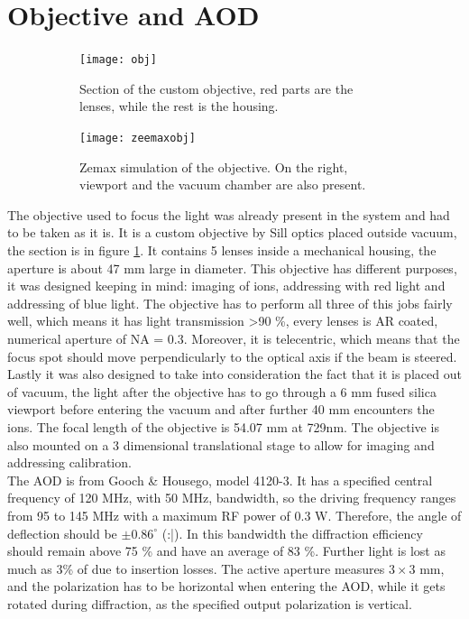 \section{Objective and AOD}
\label{sec:obj}
\begin{figure}[H]
     \centering
     \begin{subfigure}[b]{0.4\textwidth}
         \centering
         \texttt{[image: obj]}
          \caption{Section of the custom objective, red parts are the lenses, while the rest is the housing.}
         \label{objsection}
     \end{subfigure}
     \hfill
     \begin{subfigure}[b]{0.55\textwidth}
         \centering
         \texttt{[image: zeemaxobj]}
         \vspace{1em}
         \caption{Zemax simulation of the objective. On the right, viewport and the vacuum chamber are also present.}

     \end{subfigure}
        \caption{}
\end{figure}
The objective used to focus the light was already present in the system and had to be taken as it is. It is a custom objective by Sill optics placed outside vacuum, the section is in figure \ref{objsection}. It contains 5 lenses inside a mechanical housing, the aperture is about 47 mm large in diameter.
This objective has different purposes, it was designed keeping in mind: imaging of ions, addressing with red light and addressing of blue light. The objective has to perform all three of this jobs fairly well, which means it has light transmission >90 \%, every lenses is AR coated, numerical aperture of NA = 0.3. Moreover, it is telecentric, which means that the focus spot should move perpendicularly to the optical axis if the beam is steered.
 Lastly it was also designed to take into consideration the fact that it is placed out of vacuum, the light after the objective has to go through a 6 mm fused silica viewport before entering the vacuum and after further 40 mm encounters the ions. The focal length of the objective is 54.07 mm at 729nm. The objective is also mounted on a 3 dimensional translational stage to allow for imaging and addressing calibration.\\
The AOD is from Gooch \& Housego, model 4120-3. It has a specified central frequency of 120 MHz, with 50 MHz, bandwidth, so the driving frequency ranges from 95 to 145 MHz with a maximum RF power of 0.3 W. Therefore, the angle of deflection should be $\pm 0.86^{\circ}$ (:|).  In this bandwidth the diffraction efficiency should remain above 75 \% and have an average of 83 \%. Further light is lost as much as 3\% of due to insertion losses. The active aperture measures $3\times 3$ mm, and the polarization has to be horizontal when entering the AOD, while it gets rotated during diffraction, as the specified output polarization is vertical.

